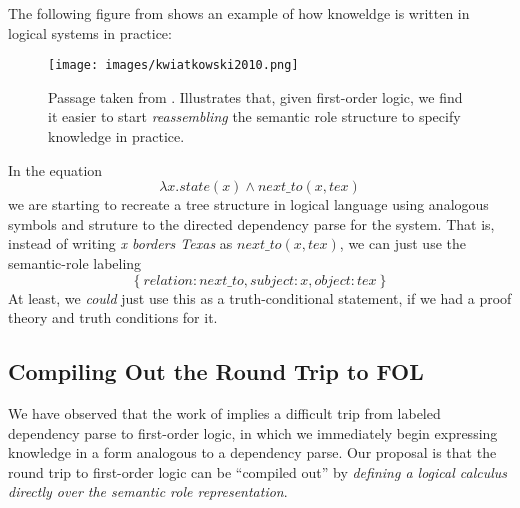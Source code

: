 \documentclass[12pt]{article}
\begin{document}
The following figure from \cite{kwiatkowski2010} shows an example of how knoweldge is written in logical systems in practice:
\begin{figure}[h]
    \centering
    \texttt{[image: images/kwiatkowski2010.png]}
    \caption{Passage taken from \cite{kwiatkowski2010}. Illustrates that, given first-order logic, we find it easier to start {\em reassembling} the semantic role structure to specify knowledge in practice.}
    \label{fig:kwiatkowski2010}
\end{figure}
In the equation
\[ \lambda x. state(x) \wedge next\_to(x, tex)\]
we are starting to recreate a tree structure in logical language using analogous symbols and struture to the directed dependency parse for the system.
That is, instead of writing {\em x borders Texas} as $next\_to(x, tex)$, we can just use the semantic-role labeling
\[ \left\{relation: next\_to, subject: x, object: tex \right\}\]
At least, we {\em could} just use this as a truth-conditional statement, if we had a proof theory and truth conditions for it.

\subsection{Compiling Out the Round Trip to FOL}
We have observed that the work of \cite{macartney2007natural,steedman2000,lewis2013combined,kwiatkowski2010,Zettlemoyer2012} implies a difficult trip from labeled dependency parse to first-order logic, in which we immediately begin expressing knowledge in a form analogous to a dependency parse.
Our proposal is that the round trip to first-order logic can be ``compiled out'' by {\em defining a logical calculus directly over the semantic role representation}.
\end{document}
